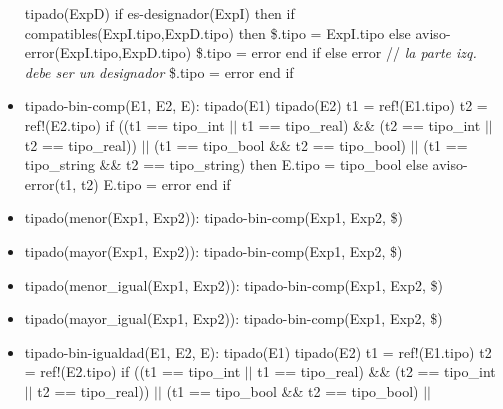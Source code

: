 \documentclass[11pt]{article}
\begin{document}
\begin{itemize}
                \subitem tipado(ExpD) 
                \subitem if es-designador(ExpI) then
                    \subsubitem if compatibles(ExpI.tipo,ExpD.tipo) then 
                        \subsubitem \hspace{2em}
                        \$.tipo = ExpI.tipo
                    \subsubitem else 
                        \subsubitem \hspace{2em} aviso-error(ExpI.tipo,ExpD.tipo) 
                        \subsubitem \hspace{2em} \$.tipo = error 
                    \subsubitem end if 
                \subitem else 
                    \subsubitem error \/// \textit{la parte izq. debe ser un designador}
                    \subsubitem \$.tipo = error 
                \subitem end if
            \item tipado-bin-comp(E1, E2, E): 
                \subitem tipado(E1) 
                \subitem tipado(E2) 
                \subitem t1 = ref!(E1.tipo) 
                \subitem t2 = ref!(E2.tipo) 
                \subitem if ((t1 == tipo\_int $\vert \vert$ t1 == tipo\_real) \&\&  (t2 == tipo\_int $\vert \vert$ t2 == tipo\_real)) $\vert \vert$ 
                    (t1 == tipo\_bool \&\&  t2 == tipo\_bool) $\vert \vert$ 
                    (t1 == tipo\_string \&\&  t2 == tipo\_string) then
                    \subsubitem E.tipo = tipo\_bool
                \subitem else 
                    \subsubitem aviso-error(t1, t2) 
                    \subsubitem E.tipo = error
                \subitem end if
            \item tipado(menor(Exp1, Exp2)):
                \subitem tipado-bin-comp(Exp1, Exp2, \$)
            \item tipado(mayor(Exp1, Exp2)): 
                \subitem tipado-bin-comp(Exp1, Exp2, \$)
            \item tipado(menor\_igual(Exp1, Exp2)): 
                \subitem tipado-bin-comp(Exp1, Exp2, \$)
            \item tipado(mayor\_igual(Exp1, Exp2)): 
                \subitem tipado-bin-comp(Exp1, Exp2, \$)
            \item tipado-bin-igualdad(E1, E2, E): 
                \subitem tipado(E1) 
                \subitem tipado(E2) 
                \subitem t1 = ref!(E1.tipo) 
                \subitem t2 = ref!(E2.tipo) 
                \subitem if ((t1 == tipo\_int $\vert \vert$ t1 == tipo\_real) \&\&  (t2 == tipo\_int $\vert \vert$ t2 == tipo\_real)) $\vert \vert$ 
                    (t1 == tipo\_bool \&\&  t2 == tipo\_bool) $\vert \vert$ 

\end{itemize}
\end{document}
